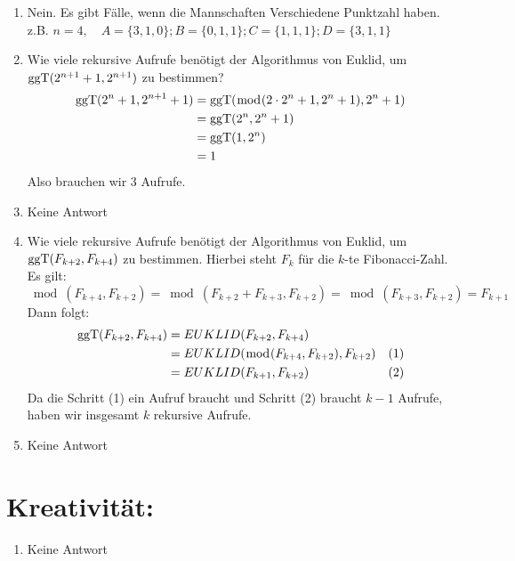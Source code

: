 \begin{enumerate}[label=(\alph*)]
        \item Nein. Es gibt F\"alle, wenn die Mannschaften Verschiedene Punktzahl haben. \\
        z.B. $n=4, \quad A=\{3,1,0\}; B=\{0,1,1\}; C=\{1,1,1\}; D= \{3,1,1 \}$
        
        \item Wie viele rekursive Aufrufe benötigt der Algorithmus von Euklid, um 
        $\operatorname{ggT}(2^{n+1} + 1, 2^{n + 1})$ zu bestimmen?\\
        \begin{align*}
			\operatorname{ggT}(2^n+1, 2^{n+1} +1) &= \operatorname{ggT}(\bmod(2\cdot 2^n +1, 2^n +1), 2^n+1) \\
			&= \operatorname{ggT}(2^n,2^n+1) \\
			&= \operatorname{ggT}(1,2^n) \\
			&= 1 
		\end{align*}
		Also brauchen wir 3 Aufrufe.
        
        \item Keine Antwort
        
        \item Wie viele rekursive Aufrufe benötigt der Algorithmus von Euklid, um $\operatorname{ggT}(F_{k+2},F_{k+4})$
		zu bestimmen. Hierbei steht $F_k$ für die $k$-te Fibonacci-Zahl.
		Es gilt:
		\[\bmod(F_{k+4},F_{k+2}) = \bmod(F_{k+2} + F_{k+3},F_{k+2}) = \bmod(F_{k+3},F_{k+2}) = F_{k+1}\]
		Dann folgt:
		\begin{align*}
			\operatorname{ggT}(F_{k+2},F_{k+4}) &= EUKLID(F_{k+2},F_{k+4}) \\
			 &= EUKLID(\bmod(F_{k+4},F_{k+2}),F_{k+2}) &(1) \\ 
			 &= EUKLID(F_{k+1},F_{k+2}) &(2)
		\end{align*}
		Da die Schritt (1) ein Aufruf braucht und Schritt (2) braucht $k-1$ Aufrufe, haben wir insgesamt
		$k$ rekursive Aufrufe.

        \item Keine Antwort

    \end{enumerate}
    \section*{Kreativität:}
    \begin{enumerate}[label=(\alph*)]
    	\item Keine Antwort
    \end{enumerate}

